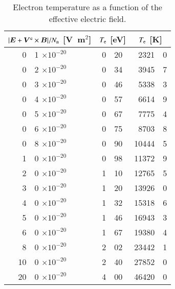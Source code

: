 \documentclass{warpdoc}
\renewcommand{\fontsizetable}{\scalefont{0.85}}
\renewcommand{\vec}[1]{\bm{#1}}
\begin{document}
%
\begin{table}
  \center\fontsizetable
  \begin{threeparttable}
    \caption{Electron temperature as a function of the effective electric field.\cite{misc:1981:aleksandrov}}
    \label{tab:Te}
    \fontsizetable
    \begin{tabular}{r@{.}lr@{.}lr@{.}l}
    \toprule
    \multicolumn{2}{c}{$|\vec{E}+\vec{V}^{\rm e} \times \vec{B}|/N_{\rm n}$ [V~m$^2$]}  & \multicolumn{2}{c}{$T_{\rm e}$ [eV]}   &  \multicolumn{2}{c}{$T_{\rm e}$ [K]} \\
    \midrule
      0&1 $\times 10^{-20}$    &  0&20          &  2321&0\\
      0&2 $\times 10^{-20}$    &  0&34          &  3945&7\\
      0&3 $\times 10^{-20}$    &  0&46          &  5338&3\\
      0&4 $\times 10^{-20}$    &  0&57          &  6614&9\\
      0&5 $\times 10^{-20}$    &  0&67          &  7775&4\\
      0&6 $\times 10^{-20}$    &  0&75          &  8703&8\\
      0&8 $\times 10^{-20}$    &  0&90          & 10444&5\\
      1&0 $\times 10^{-20}$    &  0&98          & 11372&9\\
      2&0 $\times 10^{-20}$    &  1&10          & 12765&5\\
      3&0 $\times 10^{-20}$    &  1&20          & 13926&0\\
      4&0 $\times 10^{-20}$    &  1&32          & 15318&6\\
      5&0 $\times 10^{-20}$    &  1&46          & 16943&3\\
      6&0 $\times 10^{-20}$    &  1&67          & 19380&4\\
      8&0 $\times 10^{-20}$    &  2&02          & 23442&1\\
     10&0 $\times 10^{-20}$    &  2&40          & 27852&0\\
     20&0 $\times 10^{-20}$    &  4&00          & 46420&0\\
    \bottomrule
    \end{tabular}
   \end{threeparttable}
\end{table}
%
\end{document}

